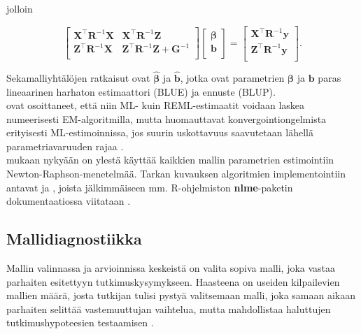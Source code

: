 \documentclass[finnish]{docopts}
\begin{document}
jolloin

$$
\begin{bmatrix}
\bm{X}^\top \bm{R}^{-1} \bm{X} & \bm{X}^\top \bm{R}^{-1} \bm{Z} \\
\bm{Z}^\top \bm{R}^{-1} \bm{X} & \bm{Z}^\top \bm{R}^{-1} \bm{Z} + \bm{G}^{-1}\\
\end{bmatrix}
\begin{bmatrix}
\bm{\beta} \\
\bm{b}\\
\end{bmatrix}
=
\begin{bmatrix}
\bm{X}^\top \bm{R}^{-1} \bm{y} \\
\bm{Z}^\top \bm{R}^{-1} \bm{y}\\
\end{bmatrix}.
$$

Sekamalliyhtälöjen ratkaisut ovat $\hat{\bm{\beta}}$ ja $\hat{\bm{b}}$, jotka ovat parametrien $\bm{\beta}$ ja $\bm{b}$ paras lineaarinen harhaton estimaattori (BLUE) ja ennuste (BLUP).\\

\cite{laird82} ovat osoittaneet, että niin ML- kuin REML-estimaatit voidaan laskea numeerisesti EM-algoritmilla, mutta huomauttavat konvergointiongelmista erityisesti ML-estimoinnissa, jos suurin uskottavuus saavutetaan lähellä parametriavaruuden rajaa \cite{verbeke00}.\\

\cite{verbeke00} mukaan nykyään on ylestä käyttää kaikkien mallin parametrien estimointiin Newton-Raphson-menetelmää. Tarkan kuvauksen algoritmien implementointiin antavat \cite{lindstrom88} ja \cite{lindstrom90}, joista jälkimmäiseen mm. R-ohjelmiston \textbf{nlme}-paketin dokumentaatiossa viitataan \cite{nlme13}.\\

\subsection{Mallidiagnostiikka}
\label{sub:mallidiag}

Mallin valinnassa ja arvioinnissa keskeistä on valita sopiva malli, joka vastaa parhaiten esitettyyn tutkimuskysymykseen. Haasteena on useiden kilpailevien mallien määrä, josta tutkijan tulisi pystyä valitsemaan malli, joka samaan aikaan parhaiten selittää vastemuuttujan vaihtelua, mutta mahdollistaa haluttujen tutkimushypoteesien testaamisen \cite{west14}.\\
\end{document}
